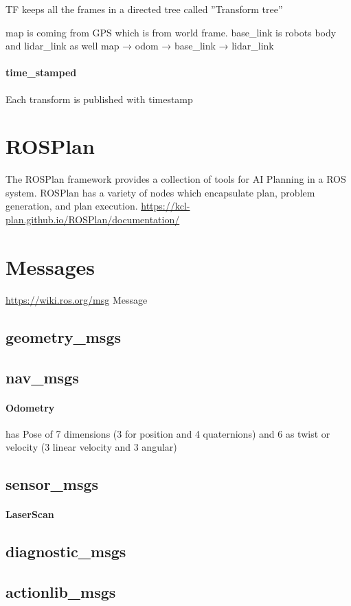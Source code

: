     TF keeps all the frames in a directed tree called ''Transform tree''
    
    
    map is coming from GPS which is from world frame. base\_link is robots body and lidar\_link as well
    map → odom → base\_link → lidar\_link
    
    \paragraph{time\_stamped}
        Each transform is published with timestamp
        
\section{ROSPlan}
    The ROSPlan framework provides a collection of tools for AI Planning in a ROS system. ROSPlan has a variety of nodes which encapsulate plan, problem generation, and plan execution.
    \url{https://kcl-plan.github.io/ROSPlan/documentation/}
\section{Messages}
    \url{https://wiki.ros.org/msg}
    Message 
    \subsection{geometry\_msgs}
    \subsection{nav\_msgs}
        \paragraph{Odometry}
            has Pose of 7 dimensions (3 for position and 4 quaternions) and 6 as twist or velocity (3 linear velocity and 3 angular)
    \subsection{sensor\_msgs}
        \paragraph{LaserScan}
    \subsection{diagnostic\_msgs}
    \subsection{actionlib\_msgs}
